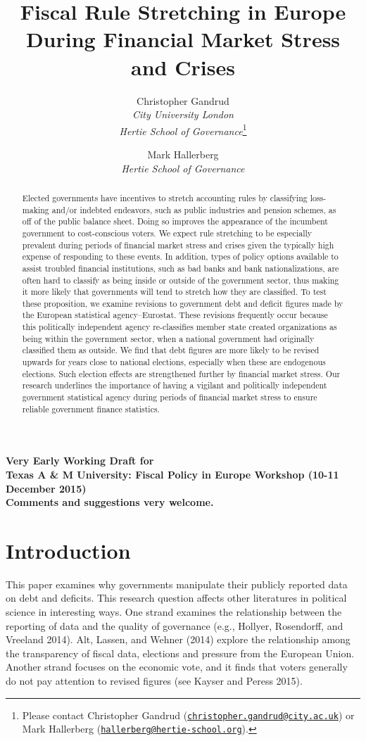 \documentclass[]{article}
\title{Fiscal Rule Stretching in Europe During Financial Market Stress and Crises}
\author{Christopher Gandrud \\ \emph{City University London} \\ \emph{Hertie School of Governance}\footnote{Please contact Christopher Gandrud
(\href{mailto:christopher.gandrud@city.ac.uk}{\nolinkurl{christopher.gandrud@city.ac.uk}}) or Mark Hallerberg (\href{mailto:hallerberg@hertie-school.org}{\nolinkurl{hallerberg@hertie-school.org}}).}
\and
Mark Hallerberg \\ \emph{Hertie School of Governance}}
\begin{document}
\maketitle

\begin{center}
    \textbf{Very Early Working Draft for\\ Texas A \& M University: Fiscal Policy in Europe Workshop (10-11 December 2015) \\
    Comments and suggestions very welcome.}
\end{center}

\begin{abstract}
    Elected governments have incentives to stretch accounting rules by classifying loss-making and/or indebted endeavors, such as public industries and pension schemes, as off of the public balance sheet. Doing so improves the appearance of the incumbent government to cost-conscious voters. We expect rule stretching to be especially prevalent during periods of financial market stress and crises given the typically high expense of responding to these events. In addition, types of policy options available to assist troubled financial institutions, such as bad banks and bank nationalizations, are often hard to classify as being inside or outside of the government sector, thus making it more likely that governments will tend to stretch how they are classified. To test these proposition, we examine revisions to government debt and deficit figures made by the European statistical agency--Eurostat. These revisions frequently occur because this politically independent agency re-classifies member state created organizations as being within the government sector, when a national government had originally classified them as outside. We find that debt figures are more likely to be revised upwards for years close to national elections, especially when these are endogenous elections. Such election effects are strengthened further by financial market stress. Our research underlines the importance of having a vigilant and politically independent government statistical agency during periods of financial market stress to ensure reliable government finance statistics.
\end{abstract}

\section{Introduction}

This paper examines why governments manipulate their publicly reported data on debt and deficits. This research question affects other literatures in political science in interesting ways. One strand examines the relationship between the reporting of data and the quality of governance (e.g., Hollyer, Rosendorff, and Vreeland 2014).  Alt, Lassen, and Wehner (2014) explore the relationship among the transparency of fiscal data, elections and pressure from the European Union. Another strand focuses on the economic vote, and it finds that voters generally do not pay attention to revised figures (see Kayser and Peress 2015). 
\end{document}
